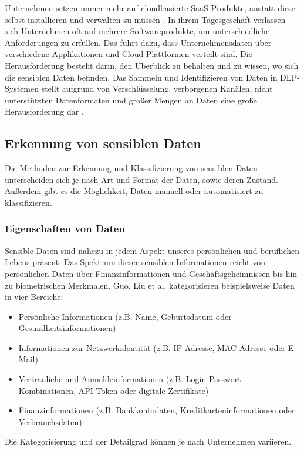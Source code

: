 Unternehmen setzen immer mehr auf cloudbasierte SaaS-Produkte, anstatt diese selbst installieren und verwalten zu müssen \cite{Gartner.2023}. In ihrem Tagesgeschäft verlassen sich Unternehmen oft auf mehrere Softwareprodukte, um unterschiedliche Anforderungen zu erfüllen. Das führt dazu, dass Unternehmensdaten über verschiedene Applikationen und Cloud-Plattformen verteilt sind. Die Herausforderung besteht darin, den Überblick zu behalten und zu wissen, wo sich die sensiblen Daten befinden. Das Sammeln und Identifizieren von Daten in DLP-Systemen stellt aufgrund von Verschlüsselung, verborgenen Kanälen, nicht unterstützten Datenformaten und großer Mengen an Daten eine große Herausforderung dar \cite{Hauer.2015}.

\subsection{Erkennung von sensiblen Daten}
Die Methoden zur Erkennung und Klassifizierung von sensiblen Daten unterscheiden sich je nach Art und Format der Daten, sowie deren Zustand. Außerdem gibt es die Möglichkeit, Daten manuell oder automatisiert zu klassifizieren.

\subsubsection{Eigenschaften von Daten}
Sensible Daten sind nahezu in jedem Aspekt unseres persönlichen und beruflichen Lebens präsent. Das Spektrum dieser sensiblen Informationen reicht von persönlichen Daten über Finanzinformationen und Geschäftsgeheimnissen bis hin zu biometrischen Merkmalen. Guo, Liu et al. \cite{Guo.2021} kategorisieren beispielsweise Daten in vier Bereiche:
\begin{itemize}
    \item Persönliche Informationen (z.B. Name, Geburtsdatum oder Gesundheitsinformationen)
    \item Informationen zur Netzwerkidentität (z.B. IP-Adresse, MAC-Adresse oder E-Mail)
    \item Vertrauliche und Anmeldeinformationen (z.B. Login-Passwort-Kombinationen, API-Token oder digitale Zertifikate)
    \item Finanzinformationen (z.B. Bankkontodaten, Kreditkarteninformationen oder Verbrauchsdaten)
\end{itemize}
Die Kategorisierung und der Detailgrad können je nach Unternehmen variieren.

